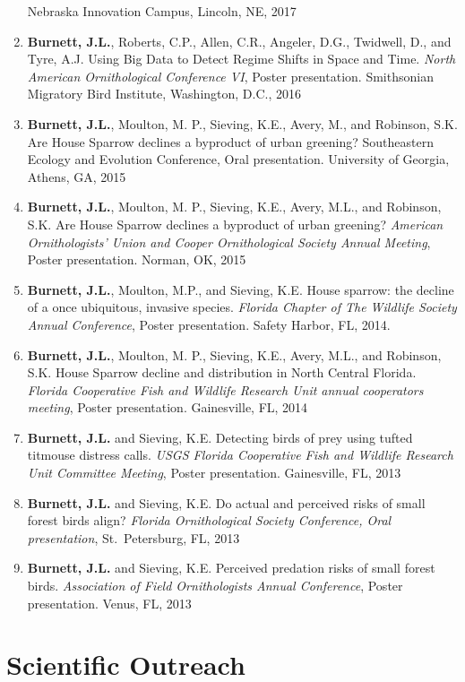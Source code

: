 \documentclass[11pt,]{article}
\begin{document}
\begin{enumerate}
  Nebraska Innovation Campus, Lincoln, NE, 2017
\item
  \textbf{Burnett, J.L.}, Roberts, C.P., Allen, C.R., Angeler, D.G.,
  Twidwell, D., and Tyre, A.J. Using Big Data to Detect Regime Shifts in
  Space and Time. \emph{North American Ornithological Conference VI},
  Poster presentation. Smithsonian Migratory Bird Institute, Washington,
  D.C., 2016
\item
  \textbf{Burnett, J.L.}, Moulton, M. P., Sieving, K.E., Avery, M., and
  Robinson, S.K. Are House Sparrow declines a byproduct of urban
  greening? Southeastern Ecology and Evolution Conference, Oral
  presentation. University of Georgia, Athens, GA, 2015
\item
  \textbf{Burnett, J.L.}, Moulton, M. P., Sieving, K.E., Avery, M.L.,
  and Robinson, S.K. Are House Sparrow declines a byproduct of urban
  greening? \emph{American Ornithologists' Union and Cooper
  Ornithological Society Annual Meeting}, Poster presentation. Norman,
  OK, 2015
\item
  \textbf{Burnett, J.L.}, Moulton, M.P., and Sieving, K.E. House
  sparrow: the decline of a once ubiquitous, invasive species.
  \emph{Florida Chapter of The Wildlife Society Annual Conference},
  Poster presentation. Safety Harbor, FL, 2014.
\item
  \textbf{Burnett, J.L.}, Moulton, M. P., Sieving, K.E., Avery, M.L.,
  and Robinson, S.K. House Sparrow decline and distribution in North
  Central Florida. \emph{Florida Cooperative Fish and Wildlife Research
  Unit annual cooperators meeting}, Poster presentation. Gainesville,
  FL, 2014
\item
  \textbf{Burnett, J.L.} and Sieving, K.E. Detecting birds of prey using
  tufted titmouse distress calls. \emph{USGS Florida Cooperative Fish
  and Wildlife Research Unit Committee Meeting}, Poster presentation.
  Gainesville, FL, 2013
\item
  \textbf{Burnett, J.L.} and Sieving, K.E. Do actual and perceived risks
  of small forest birds align? \emph{Florida Ornithological Society
  Conference, Oral presentation}, St.~Petersburg, FL, 2013
\item
  \textbf{Burnett, J.L.} and Sieving, K.E. Perceived predation risks of
  small forest birds. \emph{Association of Field Ornithologists Annual
  Conference}, Poster presentation. Venus, FL, 2013
\end{enumerate}

\hypertarget{scientific-outreach}{%
\section{Scientific Outreach}\label{scientific-outreach}}
\end{document}
